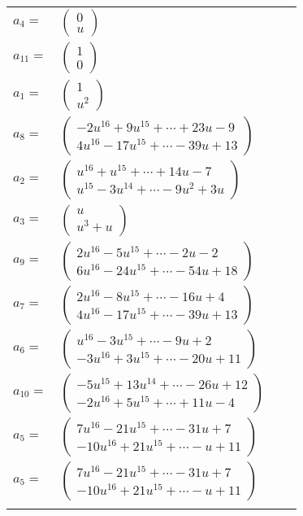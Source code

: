 \documentclass[1p]{elsarticle_modified}
\theoremstyle{definition}
\begin{document}
\begin{tabular}{m{7pt} m{180pt} m{7pt} m{180pt} }
\flushright $a_{4}=$&$\begin{pmatrix}0\\u\end{pmatrix}$ \\
\flushright $a_{11}=$&$\begin{pmatrix}1\\0\end{pmatrix}$ \\
\flushright $a_{1}=$&$\begin{pmatrix}1\\u^2\end{pmatrix}$ \\
\flushright $a_{8}=$&$\begin{pmatrix}-2 u^{16}+9 u^{15}+\cdots+23 u-9\\4 u^{16}-17 u^{15}+\cdots-39 u+13\end{pmatrix}$ \\
\flushright $a_{2}=$&$\begin{pmatrix}u^{16}+u^{15}+\cdots+14 u-7\\u^{15}-3 u^{14}+\cdots-9 u^2+3 u\end{pmatrix}$ \\
\flushright $a_{3}=$&$\begin{pmatrix}u\\u^3+u\end{pmatrix}$ \\
\flushright $a_{9}=$&$\begin{pmatrix}2 u^{16}-5 u^{15}+\cdots-2 u-2\\6 u^{16}-24 u^{15}+\cdots-54 u+18\end{pmatrix}$ \\
\flushright $a_{7}=$&$\begin{pmatrix}2 u^{16}-8 u^{15}+\cdots-16 u+4\\4 u^{16}-17 u^{15}+\cdots-39 u+13\end{pmatrix}$ \\
\flushright $a_{6}=$&$\begin{pmatrix}u^{16}-3 u^{15}+\cdots-9 u+2\\-3 u^{16}+3 u^{15}+\cdots-20 u+11\end{pmatrix}$ \\
\flushright $a_{10}=$&$\begin{pmatrix}-5 u^{15}+13 u^{14}+\cdots-26 u+12\\-2 u^{16}+5 u^{15}+\cdots+11 u-4\end{pmatrix}$ \\
\flushright $a_{5}=$&$\begin{pmatrix}7 u^{16}-21 u^{15}+\cdots-31 u+7\\-10 u^{16}+21 u^{15}+\cdots- u+11\end{pmatrix}$\\ \flushright $a_{5}=$&$\begin{pmatrix}7 u^{16}-21 u^{15}+\cdots-31 u+7\\-10 u^{16}+21 u^{15}+\cdots- u+11\end{pmatrix}$\\&\end{tabular}
\end{document}
